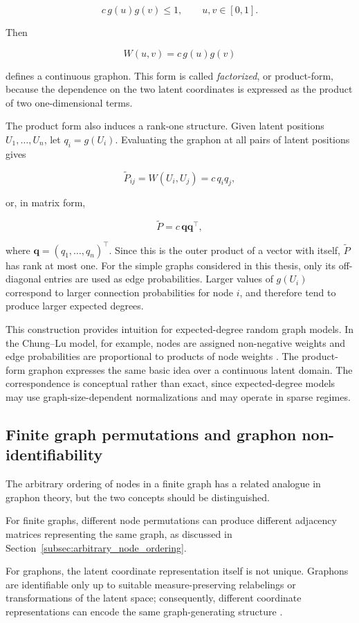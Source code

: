 \[
c\,g(u)g(v)\leq 1,
\qquad u,v\in[0,1].
\]

Then

\[
W(u,v)=c\,g(u)g(v)
\]

defines a continuous graphon. This form is called \emph{factorized}, or product-form, because the dependence on the two latent coordinates is expressed as the product of two one-dimensional terms.

The product form also induces a rank-one structure. Given latent positions \(U_1,\ldots,U_n\), let \(q_i=g(U_i)\). Evaluating the graphon at all pairs of latent positions gives

\[
\widetilde{P}_{ij}
=
W(U_i,U_j)
=
c\,q_iq_j,
\]

or, in matrix form,

\[
\widetilde{P}
=
c\,\mathbf{q}\mathbf{q}^{\top},
\]

where \(\mathbf{q}=(q_1,\ldots,q_n)^\top\). Since this is the outer product of a vector with itself, \(\widetilde{P}\) has rank at most one. For the simple graphs considered in this thesis, only its off-diagonal entries are used as edge probabilities. Larger values of \(g(U_i)\) correspond to larger connection probabilities for node \(i\), and therefore tend to produce larger expected degrees.

This construction provides intuition for expected-degree random graph models. In the Chung--Lu model, for example, nodes are assigned non-negative weights and edge probabilities are proportional to products of node weights \cite{chung2002connected}. The product-form graphon expresses the same basic idea over a continuous latent domain. The correspondence is conceptual rather than exact, since expected-degree models may use graph-size-dependent normalizations and may operate in sparse regimes.


\subsection{Finite graph permutations and graphon non-identifiability}
\label{subsec:graphon_nonidentifiability}

The arbitrary ordering of nodes in a finite graph has a related analogue in graphon theory, but the two concepts should be distinguished.

For finite graphs, different node permutations can produce different adjacency matrices representing the same graph, as discussed in Section~\ref{subsec:arbitrary_node_ordering}.

For graphons, the latent coordinate representation itself is not unique. Graphons are identifiable only up to suitable measure-preserving relabelings or transformations of the latent space; consequently, different coordinate representations can encode the same graph-generating structure \cite{lovasz2006limits,gao2015rate}.

